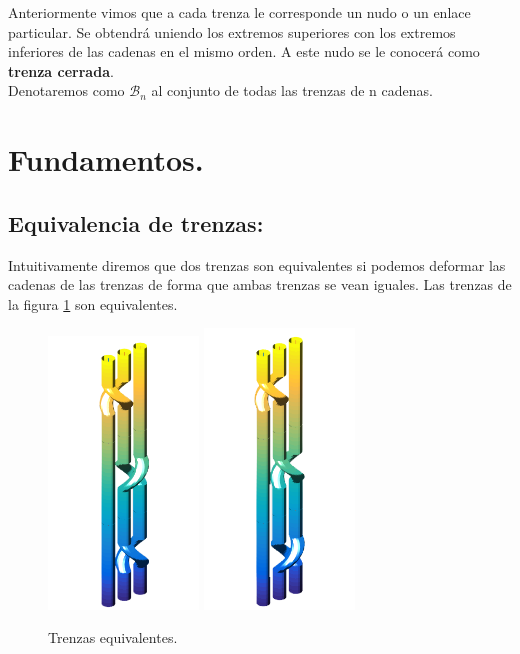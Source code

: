 Anteriormente vimos que a cada trenza le corresponde un nudo o un enlace particular. Se obtendrá uniendo los extremos superiores con los extremos inferiores de las cadenas en el mismo orden. A este nudo se le conocerá como \textbf{trenza cerrada}.\\
Denotaremos como $\mathscr{B}_{n}$ al conjunto de todas las trenzas de n cadenas.\\

\section{Fundamentos.}
\begin{centering}
	\subsection{Equivalencia de trenzas:}
\end{centering}

Intuitivamente diremos que dos trenzas son equivalentes si podemos deformar las cadenas de las trenzas de forma que ambas trenzas se vean iguales. Las trenzas de la figura \ref{tren3} son equivalentes.
\begin{figure}[h!]
	\centering
	\includegraphics[width=4cm]{itrenzas/t3.png}
	\space
	\includegraphics[width=4cm]{itrenzas/t4.png}
	\caption{Trenzas equivalentes.}
	\label{tren3} 
\end{figure}

